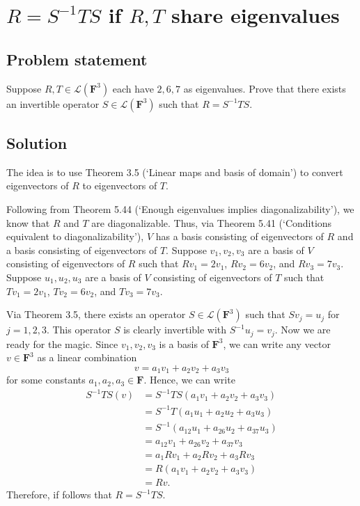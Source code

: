 \documentclass{article}
\begin{document}
\clearpage

\renewcommand{\thesection}{12}
\section{$R=S^{-1}TS$ if $R,T$ share eigenvalues}
\subsection*{Problem statement}
Suppose $R,T\in\mathcal{L}(\mathbf{F}^3)$ each have $2,6,7$ as eigenvalues. 
Prove that there exists an invertible operator $S\in\mathcal{L}(\mathbf{F}^3)$ such that $R=S^{-1}TS$.

\subsection*{Solution}
The idea is to use Theorem 3.5 (`Linear maps and basis of domain') to convert eigenvectors of $R$ to eigenvectors of $T$.

Following from Theorem 5.44 (`Enough eigenvalues implies diagonalizability'), we know that $R$ and $T$ are diagonalizable. Thus, via Theorem 5.41 (`Conditions equivalent to diagonalizability'), $V$ has a basis consisting of eigenvectors of $R$ and a basis consisting of eigenvectors of $T$. 
Suppose $v_1,v_2,v_3$ are a basis of $V$ consisting of eigenvectors of $R$ such that $Rv_1=2v_1$, $Rv_2=6v_2$, and $Rv_3=7v_3$. 
Suppose $u_1,u_2,u_3$ are a basis of $V$ consisting of eigenvectors of $T$ such that $Tv_1=2v_1$, $Tv_2=6v_2$, and $Tv_3=7v_3$. 

Via Theorem 3.5, there exists an operator $S\in\mathcal{L}(\mathbf{F}^3)$ such that $Sv_j=u_j$ for $j=1,2,3$. 
This operator $S$ is clearly invertible with $S^{-1}u_j=v_j$.
Now we are ready for the magic. 
Since $v_1,v_2,v_3$ is a basis of $\mathbf{F}^3$, we can write any vector $v\in\mathbf{F}^3$ as a linear combination
\[v=a_1v_1+a_2v_2+a_3v_3\]
for some constants $a_1,a_2,a_3\in\mathbf{F}$. 
Hence, we can write
\begin{align*}
    S^{-1}TS(v)&=S^{-1}TS(a_1v_1+a_2v_2+a_3v_3)\\
    &=S^{-1}T(a_1u_1+a_2u_2+a_3u_3)\\
    &=S^{-1}(a_12u_1+a_26u_2+a_37u_3)\\
    &=a_12v_1+a_26v_2+a_37v_3\\
    &=a_1Rv_1+a_2Rv_2+a_3Rv_3\\
    &=R(a_1v_1+a_2v_2+a_3v_3)\\
    &=Rv.
\end{align*}
Therefore, if follows that $R=S^{-1}TS$.
\end{document}
